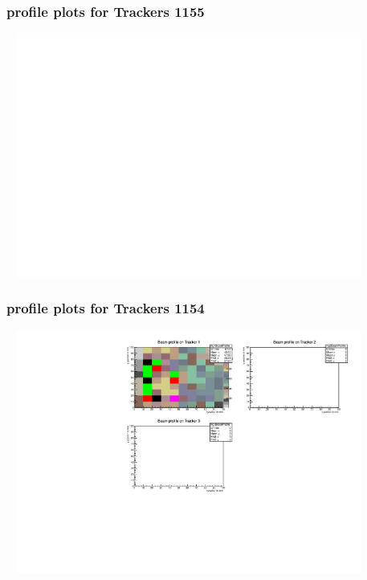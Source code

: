 \documentclass[slidestop,compress,mathserif]{beamer}
\begin{document}
\begin{frame}\frametitle{profile plots for Trackers 1155}
	 \includegraphics[width=12cm,height=8cm]{profile_plots_for_Trackers_1155.pdf}
\end{frame}
\begin{frame}\frametitle{profile plots for Trackers 1154}
	 \includegraphics[width=12cm,height=8cm]{profile_plots_for_Trackers_1154.pdf}
\end{frame}
\end{document}
